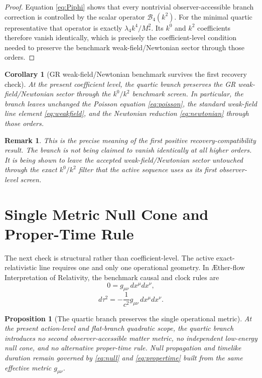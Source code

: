 \documentclass[11pt]{article}
\newcommand{\Aflow}{\AE{}ther-flow}
\newcommand{\TheoryName}{\Aflow{} Interpretation of Relativity}
\newtheorem{proposition}{Proposition}
\newtheorem{remark}{Remark}
\newtheorem{corollary}{Corollary}
\begin{document}
\begin{proof}
Equation \eqref{eq:Piphi} shows that every nontrivial observer-accessible branch correction is controlled by the scalar operator \(\mathcal B_4(k^2)\). For the minimal quartic representative that operator is exactly \(\lambda_4k^4/M_*^2\). Its \(k^0\) and \(k^2\) coefficients therefore vanish identically, which is precisely the coefficient-level condition needed to preserve the benchmark weak-field/Newtonian sector through those orders.
\end{proof}

\begin{corollary}[GR weak-field/Newtonian benchmark survives the first recovery check]
At the present coefficient level, the quartic branch preserves the GR weak-field/Newtonian sector through the \(k^0/k^2\) benchmark screen. In particular, the branch leaves unchanged the Poisson equation \eqref{eq:poisson}, the standard weak-field line element \eqref{eq:weakfield}, and the Newtonian reduction \eqref{eq:newtonian} through those orders.
\end{corollary}

\begin{remark}
This is the precise meaning of the first positive recovery-compatibility result. The branch is not being claimed to vanish identically at all higher orders. It is being shown to leave the accepted weak-field/Newtonian sector untouched through the exact \(k^0/k^2\) filter that the active sequence uses as its first observer-level screen.
\end{remark}

\section{Single Metric Null Cone and Proper-Time Rule}

The next check is structural rather than coefficient-level. The active exact-relativistic line requires one and only one operational geometry. In \TheoryName{}, the benchmark causal and clock rules are
\begin{equation}
0=g_{\mu\nu}\,dx^\mu dx^\nu,
\label{eq:null}
\end{equation}
\begin{equation}
d\tau^2=-\frac{1}{c^2}g_{\mu\nu}\,dx^\mu dx^\nu.
\label{eq:propertime}
\end{equation}

\begin{proposition}[The quartic branch preserves the single operational metric]
At the present action-level and flat-branch quadratic scope, the quartic branch introduces no second observer-accessible matter metric, no independent low-energy null cone, and no alternative proper-time rule. Null propagation and timelike duration remain governed by \eqref{eq:null} and \eqref{eq:propertime} built from the same effective metric \(g_{\mu\nu}\).
\end{proposition}
\end{document}

